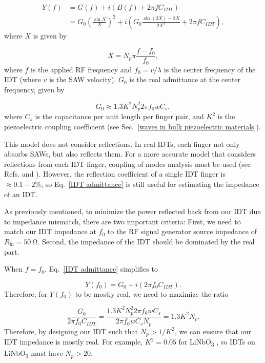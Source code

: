 \documentclass[double,12pt,1in,seploa]{beavtex}
\begin{document}
\begin{align}
    Y(f) &= G(f) + i(B(f) + 2\pi f C_{IDT})\\
    &= G_0 \left(\frac{\sin X}{X}\right)^2 + i \left(G_0 \frac{\sin (2X) - 2X}{2X^2} + 2\pi f C_{IDT}\right), \label{IDT admittance}
\end{align}
where $X$ is given by

\begin{equation}
    X = N_p \pi \frac{f - f_0}{f_0},
\end{equation}
where $f$ is the applied RF frequency and $f_0 = v/\lambda$ is the center frequency of the IDT (where $v$ is the SAW velocity). $G_0$ is the real admittance at the center frequency, given by 

\begin{equation}
    G_0 \approx 1.3 K^2 N_p^2 2 \pi f_0 w C_s,
    \label{IDT G0}
\end{equation}
where $C_s$ is the capacitance per unit length per finger pair, and $K^2$ is the piezoelectric coupling coefficient (see Sec.\ \ref{waves in bulk piezoelectric materials}).

This model does not consider reflections. In real IDTs, each finger not only absorbs SAWs, but also reflects them. For a more accurate model that considers reflections from each IDT finger, coupling of modes analysis must be used (see Refs. \cite[p.\ 140-149]{lane_integrating_2021} and \cite[Ch.\ 4]{campbell_surface_1989}). However, the reflection coefficient of a single IDT finger is $\approx 0.1-2\%$, so Eq.\ \ref{IDT admittance} is still useful for estimating the impedance of an IDT. 

As previously mentioned, to minimize the power reflected back from our IDT due to impedance mismatch, there are two important criteria: First, we need to match our IDT impedance at $f_0$ to the RF signal generator source impedance of $R_{\mathrm{in}} = \SI{50}{\ohm}$. Second, the impedance of the IDT should be dominated by the real part. 

When $f = f_0$, Eq.\ \ref{IDT admittance} simplifies to 

\begin{equation}
    Y(f_0) = G_0 + i(2\pi f_0 C_{IDT}).
\end{equation}
Therefore, for $Y(f_0)$ to be mostly real, we need to maximize the ratio

\begin{equation}
    \frac{G_0}{2\pi f_0 C_{IDT}} = \frac{1.3 K^2 N_p^2 2 \pi f_0 w C_s}{2\pi f_0 w C_s N_p} = 1.3 K^2 N_p.
    \label{G0 compared to B0}
\end{equation}
Therefore, by designing our IDT such that $N_p > 1/K^2$, we can ensure that our IDT impedance is mostly real. For example, $K^2 = 0.05$ for LiNbO\textsubscript{3} \cite{wixforth_surface_1989}, so IDTs on LiNbO\textsubscript{3} must have $N_p > 20$.
\end{document}
